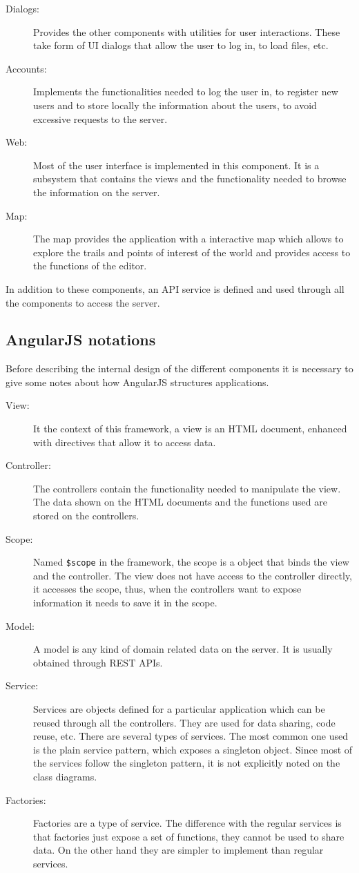 \begin{description}
\item[Dialogs:] Provides the other components with utilities for user interactions. These take form of UI dialogs that allow the user to log in, to load files, etc.
\item[Accounts:] Implements the functionalities needed to log the user in, to register new users and to store locally the information about the users, to avoid excessive requests to the server.
\item[Web:] Most of the user interface is implemented in this component. It is a subsystem that contains the views and the functionality needed to browse the information on the server.
\item[Map:] The map provides the application with a interactive map which allows to explore the trails and points of interest of the world and provides access to the functions of the editor.
\end{description}

In addition to these components, an API service is defined and used through all the components to access the server. 

\subsection*{AngularJS notations}

Before describing the internal design of the different components it is necessary to give some notes about how AngularJS structures applications.

\begin{description}
\item[View:] It the context of this framework, a view is an HTML document, enhanced with directives that allow it to access data.
\item[Controller:] The controllers contain the functionality needed to manipulate the view. The data shown on the HTML documents and the functions used are stored on the controllers.
\item[Scope:] Named \texttt{\$scope} in the framework, the scope is a object that binds the view and the controller. The view does not have access to the controller directly, it accesses the scope, thus, when the controllers want to expose information it needs to save it in the scope.
\item[Model:] A model is any kind of domain related data on the server. It is usually obtained through REST APIs.
\item[Service:] Services are objects defined for a particular application which can be reused through all the controllers. They are used for data sharing, code reuse, etc. There are several types of services. The most common one used is the plain service pattern, which exposes a singleton object. Since most of the services follow the singleton pattern, it is not explicitly noted on the class diagrams.
\item[Factories:] Factories are a type of service. The difference with the regular services is that factories just expose a set of functions, they cannot be used to share data. On the other hand they are simpler to implement than regular services.
\end{description}

